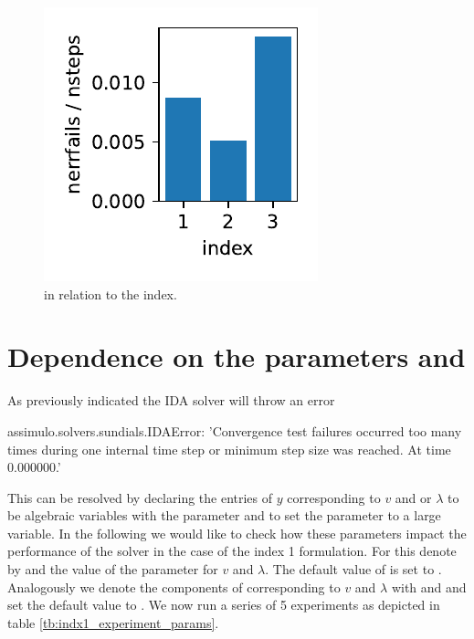 \documentclass{report}
\begin{document}
\begin{figure}[h]
\centering
\begin{minipage}[b]{0.3\textwidth}
\centering
\includegraphics[width=\textwidth]{../Plots/Project2_main/Figure_612}
\caption{ in relation to the index.}
\label{pl:nerrfails_nsteps_indx123}
\end{minipage}
\end{figure}

\section*{Dependence on the parameters  and }

As previously indicated the IDA solver will throw an error
\begin{python}
assimulo.solvers.sundials.IDAError: 'Convergence test failures occurred too many times during one internal time step or minimum step size was reached. At time 0.000000.'
\end{python}
This can be resolved by declaring the entries of $y$ corresponding to $v$ and or $\lambda$ to be algebraic variables with the parameter  and to set the parameter  to a large variable. In the following we would like to check how these parameters impact the performance of the solver in the case of the index 1 formulation. For this denote by  and  the value of the  parameter for $v$ and $\lambda$. The default value of  is set to . Analogously we denote the components of  corresponding to $v$ and $\lambda$ with  and  and set the default value to . We now run a series of 5 experiments as depicted in table \ref{tb:indx1_experiment_params}.
\end{document}

